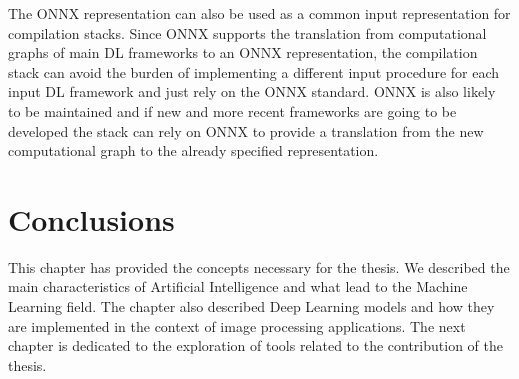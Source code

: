 \documentclass[../main.tex]{subfiles}
\begin{document}
The ONNX representation can also be used as a common input representation for compilation stacks.
Since ONNX supports the translation from computational graphs of main DL frameworks to an ONNX representation, the compilation stack can avoid the burden of implementing a different input procedure for each input DL framework and just rely on the ONNX standard.
ONNX is also likely to be maintained and if new and more recent frameworks are going to be developed the stack can rely on ONNX to provide a translation from the new computational graph to the already specified representation.

\section{Conclusions}
This chapter has provided the concepts necessary for the thesis. 
We described the main characteristics of Artificial Intelligence and what lead to the Machine Learning field.
The chapter also described Deep Learning models and how they are implemented in the context of image processing applications.
The next chapter is dedicated to the exploration of tools related to the contribution of the thesis.
\end{document}
